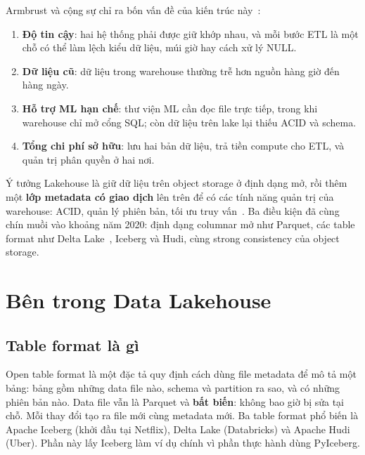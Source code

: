 \documentclass[12pt]{article}
\begin{document}
Armbrust và cộng sự chỉ ra bốn vấn đề của kiến trúc này~\cite{armbrust2021lakehouse}:

\begin{enumerate}
    \item \textbf{Độ tin cậy}: hai hệ thống phải được giữ khớp nhau, và mỗi bước ETL là một chỗ có thể làm lệch kiểu dữ liệu, múi giờ hay cách xử lý NULL.
    \item \textbf{Dữ liệu cũ}: dữ liệu trong warehouse thường trễ hơn nguồn hàng giờ đến hàng ngày.
    \item \textbf{Hỗ trợ ML hạn chế}: thư viện ML cần đọc file trực tiếp, trong khi warehouse chỉ mở cổng SQL; còn dữ liệu trên lake lại thiếu ACID và schema.
    \item \textbf{Tổng chi phí sở hữu}: lưu hai bản dữ liệu, trả tiền compute cho ETL, và quản trị phân quyền ở hai nơi.
\end{enumerate}

Ý tưởng Lakehouse là giữ dữ liệu trên object storage ở định dạng mở, rồi thêm một \textbf{lớp metadata có giao dịch} lên trên để có các tính năng quản trị của warehouse: ACID, quản lý phiên bản, tối ưu truy vấn~\cite{armbrust2021lakehouse}. Ba điều kiện đã cùng chín muồi vào khoảng năm 2020: định dạng columnar mở như Parquet, các table format như Delta Lake~\cite{armbrust2020delta}, Iceberg và Hudi, cùng strong consistency của object storage.

\section{Bên trong Data Lakehouse}
\label{sec:lakehouse}

\subsection{Table format là gì}

Open table format là một đặc tả quy định cách dùng file metadata để mô tả một bảng: bảng gồm những data file nào, schema và partition ra sao, và có những phiên bản nào. Data file vẫn là Parquet và \textbf{bất biến}: không bao giờ bị sửa tại chỗ. Mỗi thay đổi tạo ra file mới cùng metadata mới. Ba table format phổ biến là Apache Iceberg (khởi đầu tại Netflix), Delta Lake (Databricks) và Apache Hudi (Uber). Phần này lấy Iceberg làm ví dụ chính vì phần thực hành dùng PyIceberg.
\end{document}
